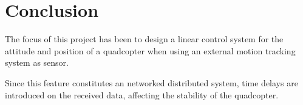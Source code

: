 \chapter{Conclusion}
%
%
%
%
%
%

The focus of this project has been to design a linear control system for the attitude and position of a quadcopter when using an external motion tracking system as sensor.

Since this feature constitutes an networked distributed system, time delays are introduced on the received data, affecting the stability of the quadcopter.

